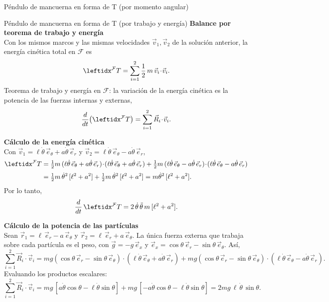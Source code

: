 \begin{solucion}{Péndulo de mancuerna en forma de T (por momento angular)}
\end{solucion}

\begin{solucion}{Péndulo de mancuerna en forma de T (por trabajo y energía)}
\textbf{Balance por teorema de trabajo y energía}\\
Con los mismos marcos y las mismas velocidades $\vec{v}_1,\vec{v}_2$ de la solución anterior, la energía cinética total en $\mathcal{F}$ es
$$\marc{T}{F}{}=\sum_{i=1}^{2}\frac{1}{2}\,m\,\vec{v}_i\!\cdot\!\vec{v}_i .$$
Teorema de trabajo y energía en $\mathcal{F}$: la variación de la energía cinética es la potencia de las fuerzas internas y externas,
$$\frac{d}{dt}\big(\marc{T}{F}{}\big)=\sum_{i=1}^{2}\vec{R}_i\!\cdot\!\vec{v}_i .$$

\textbf{Cálculo de la energía cinética}\\
Con $\vec{v}_1=\ell\dot\theta\,\vec{e}_\theta + a\dot\theta\,\vec{e}_r$ y $\vec{v}_2=\ell\dot\theta\,\vec{e}_\theta - a\dot\theta\,\vec{e}_r$,
$$\begin{aligned}
\marc{T}{F}{}
&= \tfrac12 m\,(\ell\dot\theta\,\vec{e}_\theta + a\dot\theta\,\vec{e}_r)\!\cdot\!(\ell\dot\theta\,\vec{e}_\theta + a\dot\theta\,\vec{e}_r)
   + \tfrac12 m\,(\ell\dot\theta\,\vec{e}_\theta - a\dot\theta\,\vec{e}_r)\!\cdot\!(\ell\dot\theta\,\vec{e}_\theta - a\dot\theta\,\vec{e}_r)\\[1mm]
&= \tfrac12 m\,\dot\theta^2\,[\ell^2 + a^2] + \tfrac12 m\,\dot\theta^2\,[\ell^2 + a^2]
= m\dot\theta^2\,[\ell^2+a^2].
\end{aligned}$$
Por lo tanto,
$$\frac{d}{dt}\,\marc{T}{F}{} = 2\,\dot\theta\,\ddot\theta\,m\,[\ell^2+a^2].$$

\textbf{Cálculo de la potencia de las partículas}\\
Sean $\vec{r}_1=\ell\,\vec{e}_r-a\,\vec{e}_\theta$ y $\vec{r}_2=\ell\,\vec{e}_r+a\,\vec{e}_\theta$. La única fuerza externa que trabaja sobre cada partícula es el peso, con $\vec{g}=-g\,\vec{e}_x$ y $\vec{e}_x=\cos\theta\,\vec{e}_r-\sin\theta\,\vec{e}_\theta$. Así,
$$\sum_{i=1}^{2}\vec{R}_i\!\cdot\!\vec{v}_i
= m g(\cos\theta\,\vec{e}_r-\sin\theta\,\vec{e}_\theta)\!\cdot\!(\ell\dot\theta\,\vec{e}_\theta + a\dot\theta\,\vec{e}_r)
 + m g(\cos\theta\,\vec{e}_r-\sin\theta\,\vec{e}_\theta)\!\cdot\!(\ell\dot\theta\,\vec{e}_\theta - a\dot\theta\,\vec{e}_r).$$
Evaluando los productos escalares:
$$\sum_{i=1}^{2}\vec{R}_i\!\cdot\!\vec{v}_i
= mg\,[a\dot\theta\cos\theta-\ell\dot\theta\sin\theta]
 + mg\,[-a\dot\theta\cos\theta-\ell\dot\theta\sin\theta]
= 2mg\,\ell\,\dot\theta\,\sin\theta .$$


\end{solucion}
